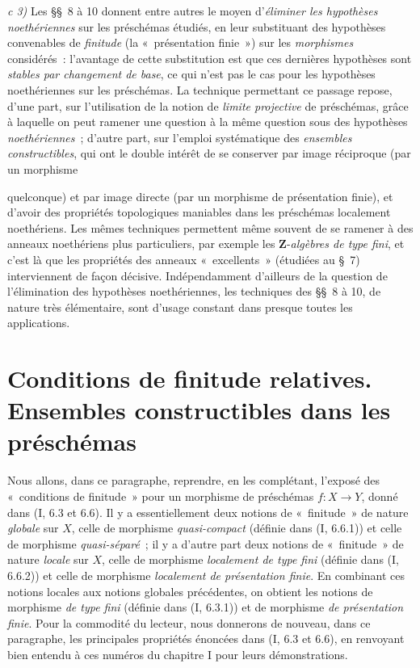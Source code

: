 \documentclass[10pt,oneside]{book}
\newcommand{\oldpage}[2][]{%
  \setcounter{footnote}{0}%
  \marginpar{\scriptsize\textbf{#1}~|~#2}\ignorespaces}
\begin{document}
\medskip
\noindent
\emph{c 3)} Les §§~8 à 10 donnent entre autres le moyen d'\emph{éliminer les
hypothèses noethériennes} sur les préschémas étudiés, en leur substituant des
hypothèses convenables de \emph{finitude} (la «~présentation finie~») sur les
\emph{morphismes} considérés~: l'avantage de cette substitution est que ces
dernières hypothèses sont \emph{stables par changement de base}, ce qui n'est
pas le cas pour les hypothèses noethériennes sur les préschémas. La technique
permettant ce passage repose, d'une part, sur l'utilisation de la notion de
\emph{limite projective} de préschémas, grâce à laquelle on peut ramener une
question à la même question sous des hypothèses \emph{noethériennes}~; d'autre
part, sur l'emploi systématique des \emph{ensembles constructibles}, qui ont
le double intérêt de se conserver par image réciproque (par un morphisme

\oldpage[IV-1]{224}

quelconque) et par image directe (par un morphisme de présentation finie), et
d'avoir des propriétés topologiques maniables dans les préschémas localement
noethériens. Les mêmes techniques permettent même souvent de se ramener à des
anneaux noethériens plus particuliers, par exemple les
$\mathbf Z$-\emph{algèbres de type fini}, et c'est là que les propriétés des
anneaux «~excellents~» (étudiées au §~7) interviennent de façon décisive.
Indépendamment d'ailleurs de la question de l'élimination des hypothèses
noethériennes, les techniques des §§~8 à 10, de nature très élémentaire, sont
d'usage constant dans presque toutes les applications.

\setcounter{section}{0}

\section{Conditions de finitude relatives. Ensembles constructibles dans les préschémas}
\label{section:IV.1-fr}

Nous allons, dans ce paragraphe, reprendre, en les complétant, l'exposé des
«~conditions de finitude~» pour un morphisme de préschémas $f:X\to Y$, donné
dans (I, 6.3 et 6.6). Il y a essentiellement deux notions de «~finitude~» de
nature \emph{globale} sur $X$, celle de morphisme \emph{quasi-compact}
(définie dans (I, 6.6.1)) et celle de morphisme \emph{quasi-séparé}~; il y a
d'autre part deux notions de «~finitude~» de nature \emph{locale} sur $X$,
celle de morphisme \emph{localement de type fini} (définie dans (I, 6.6.2))
et celle de morphisme \emph{localement de présentation finie}. En combinant
ces notions locales aux notions globales précédentes, on obtient les notions
de morphisme \emph{de type fini} (définie dans (I, 6.3.1)) et de morphisme
\emph{de présentation finie}. Pour la commodité du lecteur, nous donnerons de
nouveau, dans ce paragraphe, les principales propriétés énoncées dans (I, 6.3
et 6.6), en renvoyant bien entendu à ces numéros du chapitre I pour leurs
démonstrations.
\end{document}
